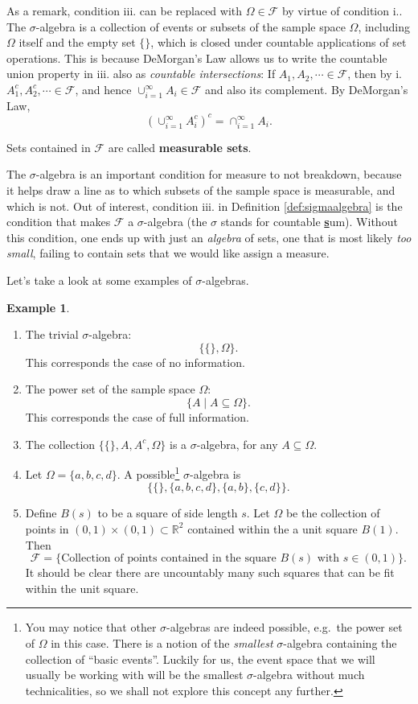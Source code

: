 \documentclass[
]{book}
\newcommand{\bbR}{\mathbb{R}}
\newcommand{\cF}{{\mathcal F}}
\theoremstyle{definition}
\theoremstyle{definition}
\newtheorem{example}{Example}[chapter]
\theoremstyle{definition}
\theoremstyle{definition}
\theoremstyle{remark}
\begin{document}
As a remark, condition iii. can be replaced with \(\Omega\in\cF\) by virtue of condition i..
The \(\sigma\)-algebra is a collection of events or subsets of the sample space \(\Omega\), including \(\Omega\) itself and the empty set \(\{\}\), which is closed under countable applications of set operations.
This is because DeMorgan's Law allows us to write the countable union property in iii. also as \emph{countable intersections}: If \(A_1,A_2,\cdots \in \cF\), then by i. \(A_1^c,A_2^c,\cdots \in \cF\), and hence \(\cup_{i=1}^\infty A_i\in\cF\) and also its complement. By DeMorgan's Law,
\[
\left( \cup_{i=1}^\infty A_i^c \right)^c = \cap_{i=1}^\infty A_i.
\]

Sets contained in \(\cF\) are called \textbf{measurable sets}.

The \(\sigma\)-algebra is an important condition for measure to not breakdown, because it helps draw a line as to which subsets of the sample space is measurable, and which is not.
Out of interest, condition iii. in Definition \ref{def:sigmaalgebra} is the condition that makes \(\cF\) a \(\sigma\)-algebra (the \(\sigma\) stands for countable \uline{\textbf{s}}um).
Without this condition, one ends up with just an \emph{algebra} of sets, one that is most likely \emph{too small}, failing to contain sets that we would like assign a measure.

Let's take a look at some examples of \(\sigma\)-algebras.

\begin{example}

\begin{enumerate}
\def\labelenumi{\arabic{enumi}.}
\item
  The trivial \(\sigma\)-algebra: \[\big\{ \{\}, \Omega \big\}.\] This corresponds the case of no information.
\item
  The power set of the sample space \(\Omega\): \[\big\{ A \mid A \subseteq \Omega \big\}.\] This corresponds the case of full information.
\item
  The collection \(\big\{ \{\}, A, A^c, \Omega \big\}\) is a \(\sigma\)-algebra, for any \(A\subseteq \Omega\).
\item
  Let \(\Omega = \{a,b,c,d\}\). A possible\footnote{You may notice that other \(\sigma\)-algebras are indeed possible, e.g.~the power set of \(\Omega\) in this case. There is a notion of the \emph{smallest} \(\sigma\)-algebra containing the collection of ``basic events''. Luckily for us, the event space that we will usually be working with will be the smallest \(\sigma\)-algebra without much technicalities, so we shall not explore this concept any further.} \(\sigma\)-algebra is \[\big\{\{\}, \{a,b,c,d\}, \{a,b\}, \{c,d\} \big\}.\]
\item
  Define \(B(s)\) to be a square of side length \(s\). Let \(\Omega\) be the collection of points in \((0,1)\times(0,1)\subset \bbR^2\) contained within the a unit square \(B(1)\). Then \[\cF=\{ \text{Collection of points contained in the square } B(s) \text{ with } s \in (0,1) \}.\] It should be clear there are uncountably many such squares that can be fit within the unit square.
\end{enumerate}

\end{example}
\end{document}
